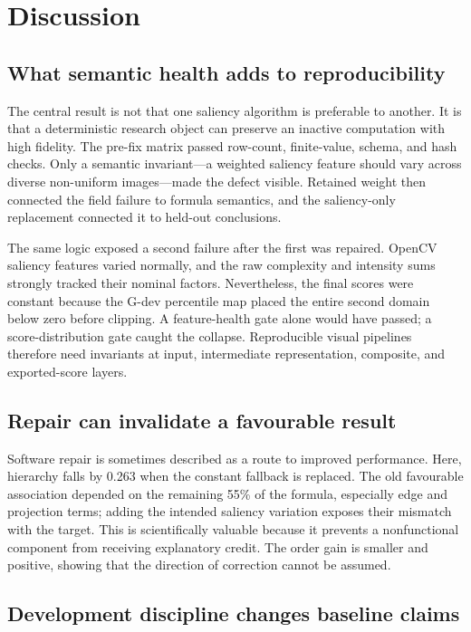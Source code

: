 \section{Discussion}
\label{sec:discussion}

\subsection{What semantic health adds to reproducibility}

The central result is not that one saliency algorithm is preferable to another. It is that a deterministic research object can preserve an inactive computation with high fidelity. The pre-fix matrix passed row-count, finite-value, schema, and hash checks. Only a semantic invariant---a weighted saliency feature should vary across diverse non-uniform images---made the defect visible. Retained weight then connected the field failure to formula semantics, and the saliency-only replacement connected it to held-out conclusions.

The same logic exposed a second failure after the first was repaired. OpenCV saliency features varied normally, and the raw complexity and intensity sums strongly tracked their nominal factors. Nevertheless, the final scores were constant because the G-dev percentile map placed the entire second domain below zero before clipping. A feature-health gate alone would have passed; a score-distribution gate caught the collapse. Reproducible visual pipelines therefore need invariants at input, intermediate representation, composite, and exported-score layers.

\subsection{Repair can invalidate a favourable result}

Software repair is sometimes described as a route to improved performance. Here, hierarchy falls by 0.263 when the constant fallback is replaced. The old favourable association depended on the remaining 55\% of the formula, especially edge and projection terms; adding the intended saliency variation exposes their mismatch with the target. This is scientifically valuable because it prevents a nonfunctional component from receiving explanatory credit. The order gain is smaller and positive, showing that the direction of correction cannot be assumed.

\subsection{Development discipline changes baseline claims}

